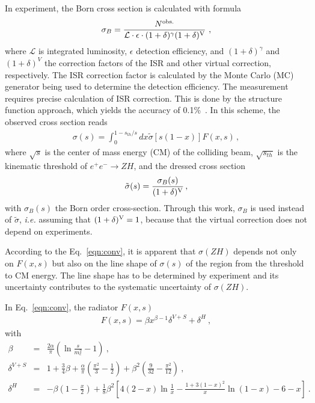 \documentclass[a4paper,10pt,twoside]{cpc-hepnp}
\begin{document}
In experiment, the Born cross section is calculated with formula 
\begin{eqnarray}\label{eqn:key}
\sigma_{B} = \frac{N^{\rm obs.}}{{\mathcal L} \cdot \epsilon\cdot (1+\delta)^{\gamma} (1+\delta)^{\rm V}}~,
\end{eqnarray}
where ${\mathcal L}$ is integrated luminosity, $\epsilon$ detection efficiency, and $(1+\delta)^\gamma$  and $(1+\delta)^{V}$ the correction factors of  the ISR and other virtual correction, respectively. The ISR correction factor is calculated by the Monte Carlo (MC) generator being used to determine the detection efficiency.  The measurement requires precise calculation of ISR correction. This is done by the structure function approach, which yields the accuracy of 0.1\%~\cite{ref:isr1, ref:isr2, ref:isr3, ref:isr4, ref:isr5}. In this scheme,  the observed cross section reads 
\begin{eqnarray} \label{eqn:conv}
\sigma(s) = \int_{0}^{1-s_{th}/s} dx\tilde{\sigma}[s(1-x)]F(x,s)\,,
\end{eqnarray}
where $\sqrt{s}$ is the center of mass energy (CM) of the colliding beam, $\sqrt{s_{th}}$ is the kinematic threshold of $e^+e^- \to ZH$, and the dressed cross section 
\begin{eqnarray}\label{eqn:vp}
\tilde{\sigma} (s)= \frac{\sigma_B(s)} {(1+\delta)^{\rm V}}\,,
\end{eqnarray}
with $\sigma_B(s)$ the Born order cross-section. Through this work, $\sigma_B$ is used instead of $\tilde{\sigma}$, {\it i.e.} assuming that $(1+\delta)^{\rm V}=1$, because that the virtual correction does not depend on experiments.

According to the Eq.~\ref{eqn:conv}, it is apparent that $\sigma(ZH)$ depends not only on $F(x,s)$  but also on the line shape of $\sigma(s)$ of the region from the threshold to CM energy. The line shape has to be determined by experiment and its uncertainty contributes to the systematic uncertainty of  $\sigma(ZH)$. 

In Eq.~\ref{eqn:conv}, the radiator $F(x,s)$ 
\begin{eqnarray}\label{eqn:radiator}
F(x,s) = \beta x^{\beta -1} \delta^{V+S} + \delta^{H}~,
\end{eqnarray}
with 
\begin{eqnarray}
\beta & =& \frac{2\alpha}{\pi}\left( \ln\frac{s}{m_e^2} -1 \right)~,\\
\delta^{V+S} & =& 1 + \frac{3}{4}\beta + \frac{\alpha}{\pi}\left(\frac{\pi^2}{3}-\frac{1}{2}\right)+\beta^2\left( \frac{9}{32}-\frac{\pi^2}{12}\right)~,\\
\delta^{H} & = & -\beta\left( 1-\frac{x}{2}\right)+\frac{1}{8}\beta^2
\left[
4(2-x)\ln\frac{1}{x} - \frac{1+3(1-x)^2}{x}\ln(1-x)-6-x
\right]~.
\end{eqnarray}
\end{document}
